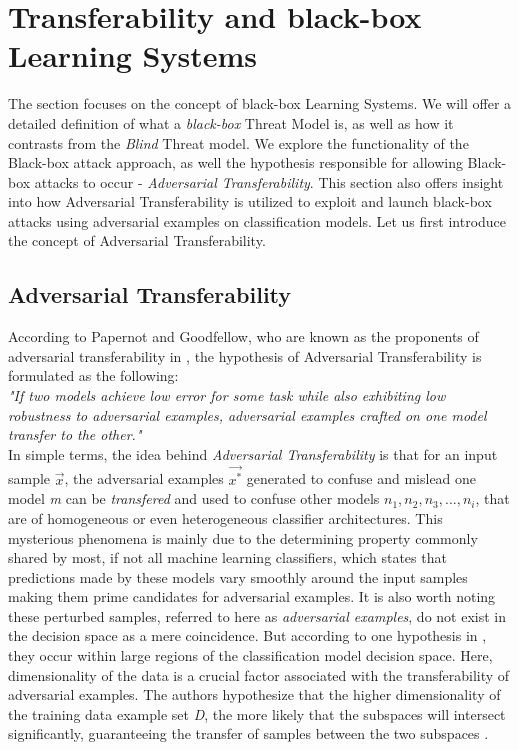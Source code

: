 \documentclass[grad,lot,lof,11pt,oneside,onehalfspace]{RUthesis}
\begin{document}
\section{Transferability and black-box Learning Systems}
 The section focuses on the concept of black-box Learning Systems. We will offer a detailed definition of what a \textit{black-box} Threat Model is, as well as how it contrasts from the \textit{Blind} Threat model. We explore the functionality of the Black-box attack approach, as well the hypothesis responsible for allowing Black-box attacks to occur - \textit{Adversarial Transferability}. This section also offers insight into how Adversarial Transferability is utilized to exploit and launch black-box attacks using adversarial examples on classification models. Let us first introduce the concept of Adversarial Transferability. 
 \subsection{Adversarial Transferability}
 According to Papernot and Goodfellow, who are known as the proponents of adversarial transferability in \cite{tramer_space_2017}, the hypothesis of Adversarial Transferability is formulated as the following:\newline\\
 \textit{"If two models achieve low error for some task while also exhibiting low robustness to adversarial examples, adversarial examples crafted on one model transfer to the other."}\newline\\  
 In simple terms, the idea behind \textit{Adversarial Transferability} is that for an input sample \textit{$\vec{x}$}, the adversarial examples $\vec{x^{*}}$ generated to confuse and mislead one model \textit{m} can be \textit{transfered} and used to confuse other models \textit{$n_{1}, n_{2}, n_{3},..., n_{i} $}, that are of homogeneous or even heterogeneous classifier architectures. This mysterious phenomena is mainly due to the determining property commonly shared by most, if not all machine learning classifiers, which states that predictions made by these models vary smoothly around the input samples making them prime candidates for adversarial examples\cite{hosseini_blocking_2017}. It is also worth noting these perturbed samples, referred to here as \textit{adversarial examples}, do not exist in the decision space as a mere coincidence. But according to one hypothesis in \cite{goodfellow_explaining_2015}, they occur within large regions of the classification model decision space. Here, dimensionality of the data is a crucial factor associated with the transferability of adversarial examples. The authors hypothesize that the higher dimensionality of the training data example set \textit{D}, the more likely that the subspaces will intersect significantly, guaranteeing the transfer of samples between the two subspaces \cite{goodfellow_explaining_2015}.\\
\end{document}

